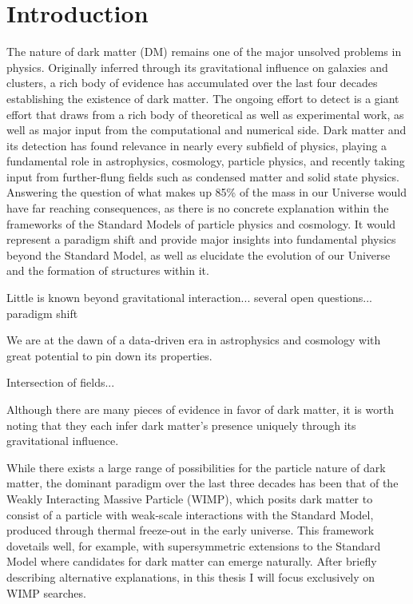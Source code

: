 \chapter{Introduction}
\label{ch:intro}

The nature of dark matter (DM) remains one of the major unsolved problems in physics. Originally inferred through its gravitational influence on galaxies and clusters, a rich body of evidence has accumulated over the last four decades establishing the existence of dark matter. The ongoing effort to detect is a giant effort that draws from a rich body of theoretical as well as experimental work, as well as major input from the computational and numerical side. Dark matter and its detection has found relevance in nearly every subfield of physics, playing a fundamental role in astrophysics, cosmology, particle physics, and recently taking input from further-flung fields such as condensed matter and solid state physics. Answering the question of what makes up 85\% of the mass in our Universe would have far reaching consequences, as there is no concrete explanation within the frameworks of the Standard Models of particle physics and cosmology. It would represent a paradigm shift and provide major insights into fundamental physics beyond the Standard Model, as well as elucidate the evolution of our Universe and the formation of structures within it. 

Little is known beyond gravitational interaction... several open questions... paradigm shift

We are at the dawn of a data-driven era in astrophysics and cosmology with great potential to pin down its properties.

Intersection of fields...

Although there are many pieces of evidence in favor of dark matter, it is
worth noting that they each infer dark matter’s presence uniquely through
its gravitational influence. 

While there exists a large range of possibilities for the particle nature of dark matter, the dominant paradigm over the last three decades has been that of the Weakly Interacting Massive Particle (WIMP), which posits dark matter to consist of a particle with weak-scale interactions with the Standard Model, produced through thermal freeze-out in the early universe. This framework dovetails well, for example, with supersymmetric extensions to the Standard Model where candidates for dark matter can emerge naturally. After briefly describing alternative explanations, in this thesis I will focus exclusively on WIMP searches.

